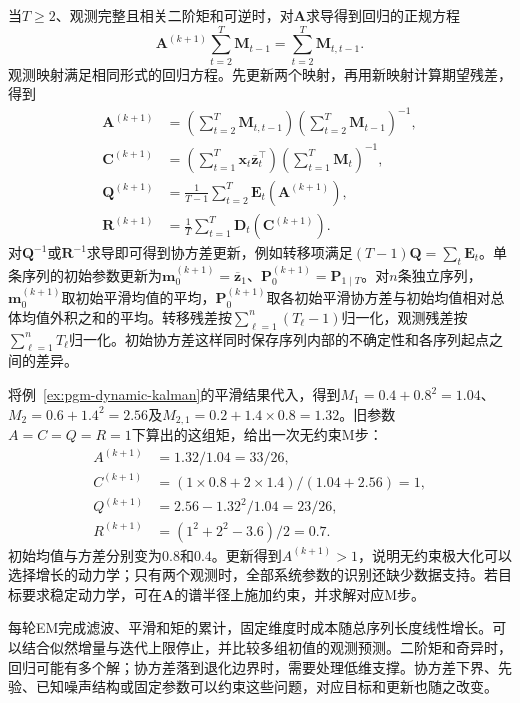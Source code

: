 当$T\geq2$、观测完整且相关二阶矩和可逆时，对$\bm A$求导得到回归的正规方程
\[
  \bm A^{(k+1)}\sum_{t=2}^{T}\bm M_{t-1}
    =\sum_{t=2}^{T}\bm M_{t,t-1}.
\]
观测映射满足相同形式的回归方程。先更新两个映射，再用新映射计算期望残差，得到
\begin{equation}
  \begin{aligned}
    \bm A^{(k+1)}
      &=\left(\sum_{t=2}^{T}\bm M_{t,t-1}\right)
        \left(\sum_{t=2}^{T}\bm M_{t-1}\right)^{-1},\\
    \bm C^{(k+1)}
      &=\left(\sum_{t=1}^{T}
        \bm x_t\overline{\bm z}_t^\top\right)
        \left(\sum_{t=1}^{T}\bm M_t\right)^{-1},\\
    \bm Q^{(k+1)}
      &=\frac{1}{T-1}\sum_{t=2}^{T}
        \bm E_t(\bm A^{(k+1)}),\\
    \bm R^{(k+1)}
      &=\frac{1}{T}\sum_{t=1}^{T}
        \bm D_t(\bm C^{(k+1)}).
  \end{aligned}
  \label{eq:pgm-dynamic-lgssm-m-step}
\end{equation}
对$\bm Q^{-1}$或$\bm R^{-1}$求导即可得到协方差更新，例如转移项满足$(T-1)\bm Q=\sum_t\bm E_t$。单条序列的初始参数更新为$\bm m_0^{(k+1)}=\overline{\bm z}_1$、$\bm P_0^{(k+1)}=\bm P_{1\mid T}$。对$n$条独立序列，$\bm m_0^{(k+1)}$取初始平滑均值的平均，$\bm P_0^{(k+1)}$取各初始平滑协方差与初始均值相对总体均值外积之和的平均。转移残差按$\sum_{\ell=1}^{n}(T_\ell-1)$归一化，观测残差按$\sum_{\ell=1}^{n}T_\ell$归一化。初始协方差这样同时保存序列内部的不确定性和各序列起点之间的差异。

将例~\ref{ex:pgm-dynamic-kalman}的平滑结果代入，得到$M_1=0.4+0.8^2=1.04$、$M_2=0.6+1.4^2=2.56$及$M_{2,1}=0.2+1.4\times0.8=1.32$。旧参数$A=C=Q=R=1$下算出的这组矩，给出一次无约束M步：
\[
  \begin{aligned}
    A^{(k+1)}&=1.32/1.04=33/26,\\
    C^{(k+1)}&=(1\times0.8+2\times1.4)/(1.04+2.56)=1,\\
    Q^{(k+1)}&=2.56-1.32^2/1.04=23/26,\\
    R^{(k+1)}&=(1^2+2^2-3.6)/2=0.7.
  \end{aligned}
\]
初始均值与方差分别变为$0.8$和$0.4$。更新得到$A^{(k+1)}>1$，说明无约束极大化可以选择增长的动力学；只有两个观测时，全部系统参数的识别还缺少数据支持。若目标要求稳定动力学，可在$\bm A$的谱半径上施加约束，并求解对应M步。

每轮EM完成滤波、平滑和矩的累计，固定维度时成本随总序列长度线性增长。可以结合似然增量与迭代上限停止，并比较多组初值的观测预测。二阶矩和奇异时，回归可能有多个解；协方差落到退化边界时，需要处理低维支撑。协方差下界、先验、已知噪声结构或固定参数可以约束这些问题，对应目标和更新也随之改变。

